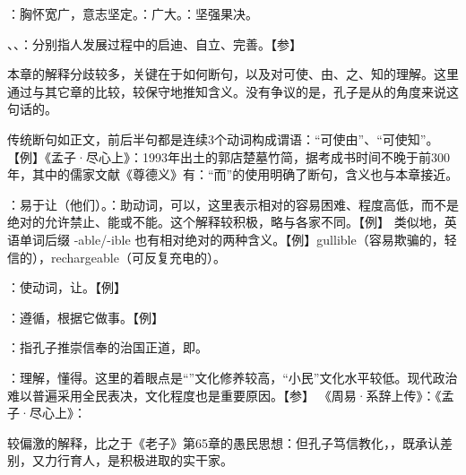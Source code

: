 {
\item {}：胸怀宽广，意志坚定。：广大。：坚强果决。
}
{}


{
\item {}、、：分别指人发展过程中的启迪、自立、完善。【参】
}
{}


{
本章的解释分歧较多，关键在于如何断句，以及对可使、由、之、知的理解。这里通过与其它章的比较，较保守地推知含义。没有争议的是，孔子是从的角度来说这句话的。

传统断句如正文，前后半句都是连续3个动词构成谓语：“可使由”、“可使知”。【例】《孟子·尽心上》：1993年出土的郭店楚墓竹简，据考成书时间不晚于前300年，其中的儒家文献《尊德义》有：“而”的使用明确了断句，含义也与本章接近。
\begin{lyitemize}
\item {}：易于让（他们）。：助动词，可以，这里表示相对的容易困难、程度高低，而不是绝对的允许禁止、能或不能。这个解释较积极，略与各家不同。【例】 类似地，英语单词后缀 -able/-ible 也有相对绝对的两种含义。【例】gullible（容易欺骗的，轻信的），rechargeable（可反复充电的）。

：使动词，让。【例】  %
\item {}：遵循，根据它做事。【例】 
\item {}：指孔子推崇信奉的治国正道，即。
\item {}：理解，懂得。这里的着眼点是“”文化修养较高，“小民”文化水平较低。现代政治难以普遍采用全民表决，文化程度也是重要原因。【参】   《周易·系辞上传》：《孟子·尽心上》：

较偏激的解释，比之于《老子》第65章的愚民思想：但孔子笃信教化，，既承认差别，又力行育人，是积极进取的实干家。
\end{lyitemize}

}
